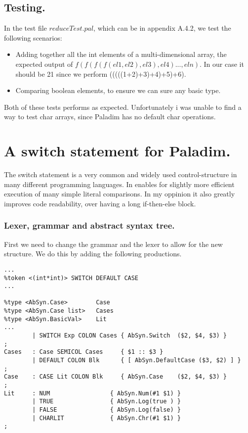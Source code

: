 \documentclass[12pt]{article}
\begin{document}
\subsection{Testing.}

In the test file $reduceTest.pal$, which can be in appendix A.4.2, we test the following scenarios:

\begin{itemize}
    \item Adding together all the int elements of a multi-dimensional array, the expected output of $f(f(f(f(el1, el2), el3), el4)..., eln)$. In our case it should be 21 since we perform (((((1+2)+3)+4)+5)+6).
    \item Comparing boolean elements, to ensure we can sure any basic type. 
\end{itemize}

\noindent Both of these tests performs as expected. Unfortunately i was unable to find a way to test char arrays, since Paladim has no default char operations. 

\pagebreak

\section{A switch statement for Paladim.}

The switch statement is a very common and widely used control-structure in many different programming languages. In enables for slightly more efficient execution of many simple literal comparisons. In my oppinion it also greatly improves code readability, over having a long if-then-else block.

\subsubsection{Lexer, grammar and abstract syntax tree.}

First we need to change the grammar and the lexer to allow for the new structure. We do this by adding the following productions.

\begin{lstlisting}[caption=Switch structure changes to Parser.grm]
...
%token <(int*int)> SWITCH DEFAULT CASE
...
       
%type <AbSyn.Case>        Case
%type <AbSyn.Case list>   Cases
%type <AbSyn.BasicVal>    Lit
...
        | SWITCH Exp COLON Cases { AbSyn.Switch  ($2, $4, $3) }
;
Cases   : Case SEMICOL Cases     { $1 :: $3 }
        | DEFAULT COLON Blk      { [ AbSyn.DefaultCase ($3, $2) ] }
;
Case    : CASE Lit COLON Blk     { AbSyn.Case    ($2, $4, $3) }
;
Lit     : NUM                 { AbSyn.Num(#1 $1) }
        | TRUE                { AbSyn.Log(true ) }
        | FALSE               { AbSyn.Log(false) }
        | CHARLIT             { AbSyn.Chr(#1 $1) }
;
\end{lstlisting}
\end{document}

